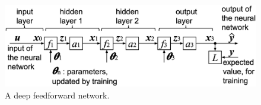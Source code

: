 \documentclass[twocolumn]{article}
\begin{document}
\begin{figure}[!tb]
 \begin{center}
  \begin{minipage}{\hsize}
   \includegraphics[width=\hsize]{fig/deep_feedforward_02.eps}
   \caption{A deep feedforward network.}
   \label{fig:deep_feedforward}
  \end{minipage}
 \end{center}
\end{figure}
\end{document}
